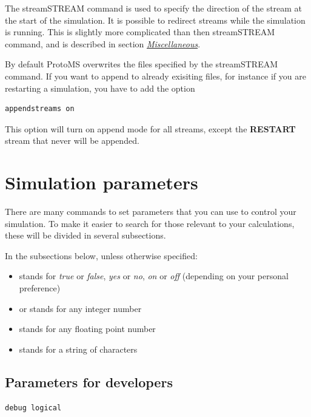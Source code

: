 \documentclass[letterpaper,10pt,english]{manual}
\begin{document}
The streamSTREAM command is used to specify the direction of the stream at the start of the simulation. It is possible to redirect streams while the simulation is running. This is slightly more complicated than then streamSTREAM command, and is described in section \hyperlink{misccmd}{\emph{Miscellaneous}}.

By default ProtoMS overwrites the files specified by the streamSTREAM command. If you want to append to already exisiting files, for instance if you are restarting a simulation, you have to add the option

\begin{Verbatim}[commandchars=@\[\]]
appendstreams on
\end{Verbatim}

This option will turn on append mode for all streams, except the \textbf{RESTART} stream that never will be appended.
\hypertarget{parameters}{}

\section{Simulation parameters}

There are many commands to set parameters that you can use to control your simulation. To make it easier to search for those relevant to your calculations, these will be divided in several subsections.

In the subsections below, unless otherwise specified:
\begin{itemize}
\item {} 
 stands for \emph{true} or \emph{false}, \emph{yes} or \emph{no}, \emph{on} or \emph{off} (depending on your personal preference)

\item {} 
 or  stands for any integer number

\item {} 
 stands for any floating point number

\item {} 
 stands for a string of characters

\end{itemize}


\subsection{Parameters for developers}
\begin{Verbatim}[commandchars=@\[\]]
debug logical
\end{Verbatim}
\end{document}
